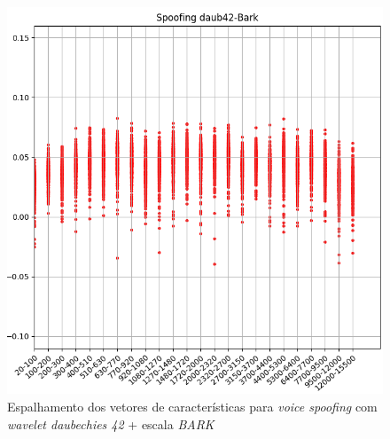 \begin{figure}[!h]
	\centering
	\includegraphics[width=.70\linewidth, height=.68\linewidth]{images/results/barkVersusMel/spoofingDaub42Bark}
	\caption{Espalhamento dos vetores de características para \textit{voice spoofing} com \textit{wavelet daubechies 42} + escala \textit{BARK} }
	\label{fig:spoofingdaub42bark}
\end{figure}

